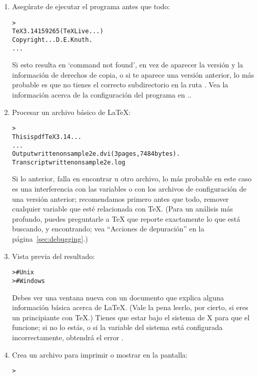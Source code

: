\documentclass{article}
\begin{document}
\begin{enumerate}
	\item Asegúrate de ejecutar el programa  antes
		que todo:
	\begin{alltt}
		> 
		TeX 3.14159265 (TeX Live ...)
		Copyright ... D.E. Knuth.
		...
	\end{alltt}
Si esto resulta en `command not found', en vez de aparecer la versión y la
información de derechos de copia, o si te aparece una versión
anterior, lo más probable es que no tienes el correcto subdirectorio
 en la ruta . Vea la información acerca de
la configuración del programa en \p.\pageref{sec:env}. 

\item Procesar un archivo básico de \LaTeX{}:
\begin{alltt}
	> 
	This is pdfTeX 3.14 ...
	...
	Output written on sample2e.dvi (3 pages, 7484 bytes).
	Transcript written on sample2e.log
\end{alltt}

Si lo anterior, falla en encontrar  u otro
archivo, lo más probable en este caso es una interferencia con
las variables o con los archivos de configuración de una
versión anterior; recomendamos primero antes que todo, remover
cualquier variable que esté relacionada con \TeX.  (Para un
análisis más profundo, puedes preguntarle a \TeX{} que reporte
exactamente lo que está buscando, y encontrando; vea
``Acciones de depuración'' en la página~\ref{sec:debugging}.)

\item Vista previa del resultado:
\begin{alltt}
>     # Unix
>   # Windows
\end{alltt}
Debes ver una ventana nueva con un documento que explica alguna
información básica acerca de \LaTeX{}. (Vale la pena leerlo, por
cierto, si eres un principiante con \TeX.) Tienes que estar bajo el
sistema de X para que el  funcione; si no lo estás, o 
si la variable del sistema  está configurada
incorrectamente, obtendrá el error .

\item Crea un archivo \PS{} para imprimir o mostrar en la pantalla:
\begin{alltt}
> 
\end{alltt}


\end{enumerate}
\end{document}
